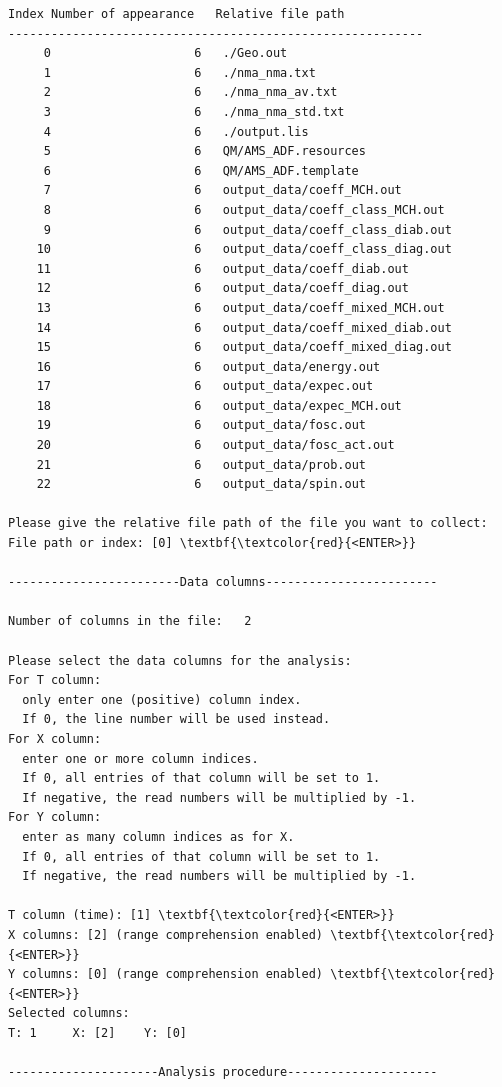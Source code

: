 \documentclass[a4paper,11pt,DIV=15,openany]{scrbook}
\begin{document}
\begin{oframed}
\begin{Verbatim}[commandchars=\\\{\}]
 Index Number of appearance   Relative file path
----------------------------------------------------------
     0                    6   ./Geo.out
     1                    6   ./nma_nma.txt
     2                    6   ./nma_nma_av.txt
     3                    6   ./nma_nma_std.txt
     4                    6   ./output.lis
     5                    6   QM/AMS_ADF.resources
     6                    6   QM/AMS_ADF.template
     7                    6   output_data/coeff_MCH.out
     8                    6   output_data/coeff_class_MCH.out
     9                    6   output_data/coeff_class_diab.out
    10                    6   output_data/coeff_class_diag.out
    11                    6   output_data/coeff_diab.out
    12                    6   output_data/coeff_diag.out
    13                    6   output_data/coeff_mixed_MCH.out
    14                    6   output_data/coeff_mixed_diab.out
    15                    6   output_data/coeff_mixed_diag.out
    16                    6   output_data/energy.out
    17                    6   output_data/expec.out
    18                    6   output_data/expec_MCH.out
    19                    6   output_data/fosc.out
    20                    6   output_data/fosc_act.out
    21                    6   output_data/prob.out
    22                    6   output_data/spin.out

Please give the relative file path of the file you want to collect:
File path or index: [0] \textbf{\textcolor{red}{<ENTER>}}

------------------------Data columns------------------------

Number of columns in the file:   2

Please select the data columns for the analysis:
For T column: 
  only enter one (positive) column index. 
  If 0, the line number will be used instead.
For X column: 
  enter one or more column indices. 
  If 0, all entries of that column will be set to 1. 
  If negative, the read numbers will be multiplied by -1.
For Y column: 
  enter as many column indices as for X. 
  If 0, all entries of that column will be set to 1. 
  If negative, the read numbers will be multiplied by -1.

T column (time): [1] \textbf{\textcolor{red}{<ENTER>}}
X columns: [2] (range comprehension enabled) \textbf{\textcolor{red}{<ENTER>}}
Y columns: [0] (range comprehension enabled) \textbf{\textcolor{red}{<ENTER>}}
Selected columns:
T: 1     X: [2]    Y: [0]

---------------------Analysis procedure---------------------


\end{Verbatim}
\end{oframed}
\end{document}
